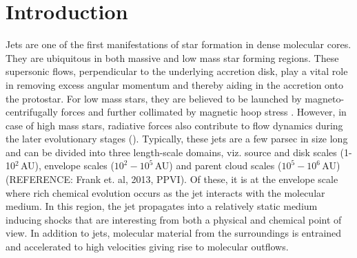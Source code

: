 \documentclass[useAMS,usenatbib]{mn2e}
\newcommand{\refer}{{\color{orange}REFERENCE}}
\begin{document}
%
%


\section{Introduction}
Jets are one of the first manifestations of star
formation in dense molecular cores. They are ubiquitous in both
massive and low mass star forming regions. These supersonic flows,
perpendicular to the underlying accretion disk, play a vital role in
removing excess angular momentum and thereby aiding in the accretion onto the protostar. 
For low mass stars, they are believed to be launched by magneto-centrifugally forces and
further collimated by magnetic hoop stress
\citep[][]{Blandford:1982p892, Konigl:2000p607}. However, in case of
high mass stars, radiative forces also contribute to flow dynamics
during the later evolutionary stages (\citealt{Vaidya:2011p8992}). 
Typically, these jets are a few parsec in size long and can be divided into
three length-scale domains, viz. source and disk scales (1-10$^{2}\,$AU),
envelope scales ($10^{2} - 10^{5}$\,AU) and parent cloud scales
($10^{5} - 10^{6}$\,AU) (\refer : Frank et. al, 2013, PPVI).
Of these, it is at the envelope scale where rich
chemical evolution occurs as the jet interacts
with the molecular medium. In this region, the jet propagates into a
relatively static medium inducing shocks that are interesting from both a
physical and chemical point of view. In addition to jets, molecular
material from the surroundings is entrained and accelerated to high
velocities giving rise to molecular outflows.
%
\end{document}
